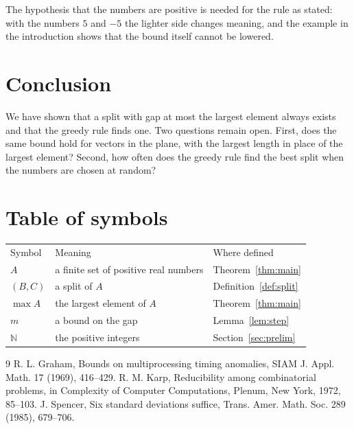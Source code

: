 \documentclass{amsart}
\theoremstyle{definition}
\begin{document}
The hypothesis that the numbers are positive is needed for the rule as stated: with the numbers $5$ and $-5$ the lighter
side changes meaning, and the example in the introduction shows that the bound itself cannot be lowered.

\section{Conclusion}\label{sec:conclusion}

We have shown that a split with gap at most the largest element always exists and that the greedy rule finds one. Two
questions remain open. First, does the same bound hold for vectors in the plane, with the largest length in place of the
largest element? Second, how often does the greedy rule find the best split when the numbers are chosen at random?

\appendix
\section{Table of symbols}\label{app:notation}

\begin{tabular}{lll}
Symbol & Meaning & Where defined \\
$A$ & a finite set of positive real numbers & Theorem~\ref{thm:main} \\
$(B,C)$ & a split of $A$ & Definition~\ref{def:split} \\
$\max A$ & the largest element of $A$ & Theorem~\ref{thm:main} \\
$m$ & a bound on the gap & Lemma~\ref{lem:step} \\
$\mathbb{N}$ & the positive integers & Section~\ref{sec:prelim} \\
\end{tabular}

\begin{thebibliography}{9}
 R. L. Graham, Bounds on multiprocessing timing anomalies, SIAM J. Appl. Math. 17 (1969), 416--429.
 R. M. Karp, Reducibility among combinatorial problems, in Complexity of Computer Computations, Plenum, New York, 1972, 85--103.
 J. Spencer, Six standard deviations suffice, Trans. Amer. Math. Soc. 289 (1985), 679--706.
\end{thebibliography}
\end{document}
